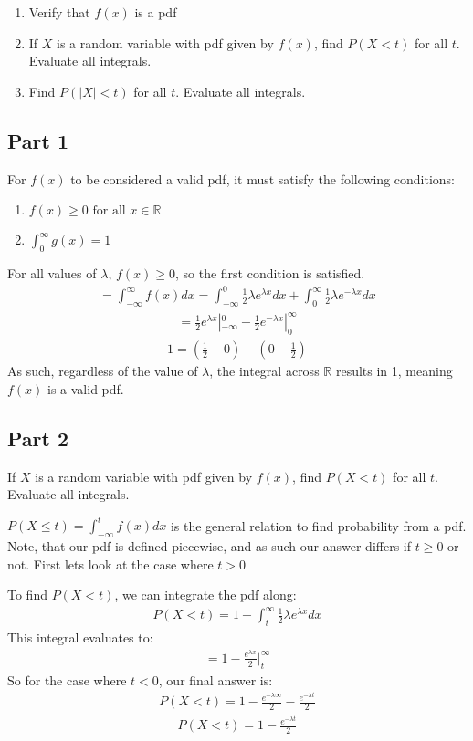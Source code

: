 \documentclass{article}
\begin{document}
\begin{enumerate}
\item
Verify that $f(x)$ is a pdf
\item
If $X$ is a random variable with pdf given by $f(x)$, find $P(X<t)$ for all $t$. Evaluate all integrals.
\item
Find $P(|X|<t)$ for all $t$. Evaluate all integrals.
\end{enumerate}

\subsection*{Part 1}
For $f(x)$ to be considered a valid pdf, it must satisfy the following conditions:
\begin{enumerate}
\item
$f(x) \geq 0 \text{ for all }x \in \mathbb{R}$
\item
$\int_{0}^\infty g(x) = 1$
\end{enumerate}
For all values of $\lambda$, $f(x)\geq 0$, so the first condition is satisfied.
\begin{align*}
 = \int_{-\infty}^{\infty} f(x) dx = \int_{-\infty}^{0} \tfrac{1}{2} \lambda e^{\lambda x} dx + \int_{0}^{\infty} \tfrac{1}{2} \lambda e^{-\lambda x} dx
\end{align*}
\begin{align*}
 = \frac{1}{2}e^{\lambda x}|_{-\infty}^{0} -\frac{1}{2}e^{-\lambda x}|_{0}^{\infty}
\end{align*}
\begin{align*}
 1 = (\frac{1}{2}-0)-(0-\frac{1}{2})
\end{align*}
As such, regardless of the value of $\lambda$, the integral across $\mathbb{R}$ results in 1, meaning $f(x)$ is a valid pdf.
\subsection*{Part 2}
If $X$ is a random variable with pdf given by $f(x)$, find $P(X<t)$ for all $t$. Evaluate all integrals.

$P(X\leq t) = \int_{-\infty}^{t} f(x) dx$ is the general relation to find probability from a pdf. Note, that our pdf is defined piecewise, and as such our answer differs if $t\geq 0$ or not. First lets look at the case where $t>0$

To find $P(X<t)$, we can integrate the pdf along:
\begin{align*}
P(X<t) = 1-\int_{t}^{\infty} \tfrac{1}{2} \lambda e^{\lambda x} dx
\end{align*}
This integral evaluates to:
\begin{align*}
 = 1- \frac{e^{\lambda x}}{2} |_{t}^{\infty}
\end{align*}
So for the case where $t<0$, our final answer is:
\begin{align*}
P(X<t) = 1- \frac{e^{-\lambda \infty}}{2} - \frac{e^{-\lambda t}}{2}
\end{align*}
\begin{align*}
P(X<t) = 1-\frac{e^{-\lambda t}}{2}
\end{align*}
\end{document}
